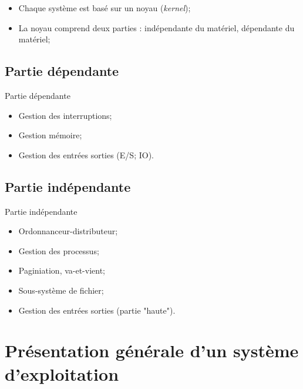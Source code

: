 \begin{frame}{\sectitle}
\begin{block}{\subsectitle}
\begin{itemize}
    \item Chaque système est basé sur un noyau (\textit{kernel});
    \item La noyau comprend deux parties : indépendante du matériel, dépendante
    du matériel;
\end{itemize}
\end{block}

\def\subsectitle{Partie dépendante}
\subsection{\subsectitle}
\begin{block}{\subsectitle}
\begin{itemize}
    \item Gestion des interruptions;
    \item Gestion mémoire;
    \item Gestion des entrées sorties (E/S; IO).
\end{itemize}

\end{block}
\end{frame}

\def\subsectitle{Partie indépendante}
\subsection{\subsectitle}

\begin{frame}{\sectitle}
\begin{block}{\subsectitle}
\begin{itemize}
    \item Ordonnanceur-distributeur;
    \item Gestion des processus;
    \item Paginiation, va-et-vient;
    \item Sous-système de fichier;
    \item Gestion des entrées sorties (partie "haute").
\end{itemize}
\end{block}


\end{frame}

\def\sectitle{Présentation générale d'un système d'exploitation}
\section{\sectitle}
\def\subsectitle{Modèle en couche}
